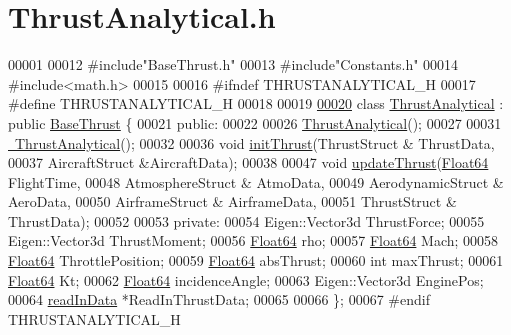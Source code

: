 \hypertarget{_thrust_analytical_8h_source}{}\section{Thrust\+Analytical.\+h}
\label{_thrust_analytical_8h_source}

\begin{DoxyCode}
00001 
00012 \textcolor{preprocessor}{#include"BaseThrust.h"}
00013 \textcolor{preprocessor}{#include"Constants.h"}
00014 \textcolor{preprocessor}{#include<math.h>}
00015 
00016 \textcolor{preprocessor}{#ifndef THRUSTANALYTICAL\_H}
00017 \textcolor{preprocessor}{#define THRUSTANALYTICAL\_H}
00018 
00019 
\hyperlink{group___engine}{00020} \textcolor{keyword}{class }\hyperlink{group___engine_class_thrust_analytical}{ThrustAnalytical} : \textcolor{keyword}{public} \hyperlink{group___engine_class_base_thrust}{BaseThrust} \{
00021 \textcolor{keyword}{public}:
00022 
00026     \hyperlink{group___engine_a5c75949a22871e861090560adb2d5f18}{ThrustAnalytical}();
00027 
00031     \hyperlink{group___engine_aeaf9dd69c10812c673d6cfae0d7ca4fd}{~ThrustAnalytical}();
00032 
00036     \textcolor{keywordtype}{void} \hyperlink{group___engine_a5eb762aee5e5823fa34b2236d9b21134}{initThrust}(ThrustStruct & ThrustData,
00037                           AircraftStruct &AircraftData);
00038 
00047     \textcolor{keywordtype}{void} \hyperlink{group___engine_a3907d6febaf711a225c0abfe8022304f}{updateThrust}(\hyperlink{group___tools_ga3f1431cb9f76da10f59246d1d743dc2c}{Float64} FlightTime,                    
00048                     AtmosphereStruct & AtmoData,        
00049                     AerodynamicStruct & AeroData,       
00050                     AirframeStruct & AirframeData,      
00051                     ThrustStruct & ThrustData);         
00052 
00053 \textcolor{keyword}{private}:
00054     Eigen::Vector3d ThrustForce;        
00055     Eigen::Vector3d ThrustMoment;       
00056     \hyperlink{group___tools_ga3f1431cb9f76da10f59246d1d743dc2c}{Float64} rho;                     
00057     \hyperlink{group___tools_ga3f1431cb9f76da10f59246d1d743dc2c}{Float64} Mach;                        
00058     \hyperlink{group___tools_ga3f1431cb9f76da10f59246d1d743dc2c}{Float64} ThrottlePosition;            
00059     \hyperlink{group___tools_ga3f1431cb9f76da10f59246d1d743dc2c}{Float64} absThrust;                   
00060     \textcolor{keywordtype}{int} maxThrust;                      
00061     \hyperlink{group___tools_ga3f1431cb9f76da10f59246d1d743dc2c}{Float64} Kt;                          
00062     \hyperlink{group___tools_ga3f1431cb9f76da10f59246d1d743dc2c}{Float64} incidenceAngle;              
00063     Eigen::Vector3d EnginePos;          
00064     \hyperlink{classread_in_data}{readInData} *ReadInThrustData;     
00065 
00066 \};
00067 \textcolor{preprocessor}{#endif  THRUSTANALYTICAL\_H}
\end{DoxyCode}

